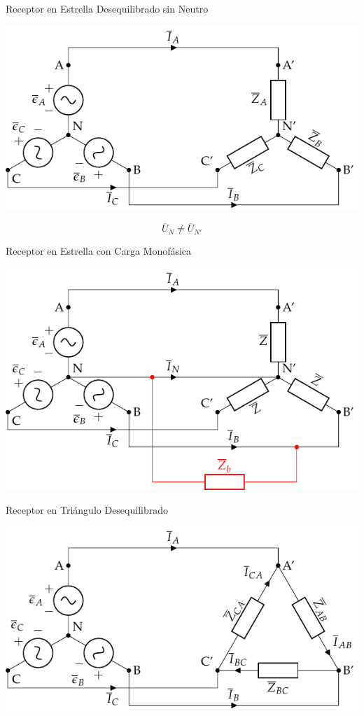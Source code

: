 \documentclass[aspectratio=169, usenames,svgnames,dvipsnames]{beamer}
\begin{document}
\begin{frame}[label={sec:org3b4dade}]{Receptor en Estrella Desequilibrado sin Neutro}
\begin{center}
\includegraphics[width=.9\linewidth]{../figs/EstrellaDesequilibrado_SinNeutro.pdf}
\end{center}

\[
\overline{U}_N \neq \overline{U}_{N'}
\]
\end{frame}
\begin{frame}[label={sec:org6d810e0}]{Receptor en Estrella con Carga Monofásica}
\begin{center}
\includegraphics[height=0.9\textheight]{../figs/Estrella_CargaMonofasica.pdf}
\end{center}
\end{frame}
\begin{frame}[label={sec:org89f41bb}]{Receptor en Triángulo Desequilibrado}
\begin{center}
\includegraphics[height=0.9\textheight]{../figs/TrianguloDesequilibrado.pdf}
\end{center}
\end{frame}
\end{document}

